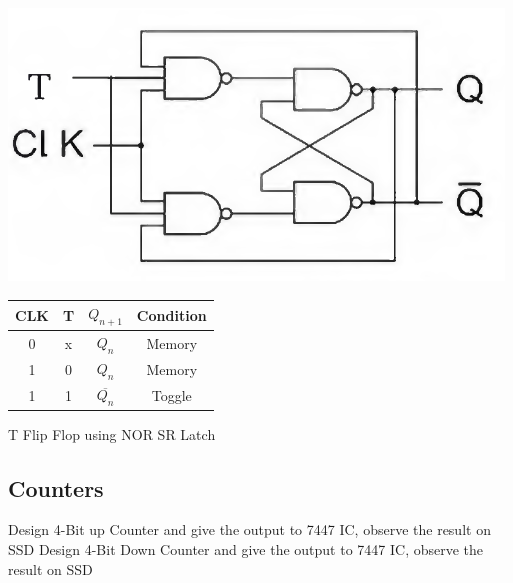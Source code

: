\documentclass[journal,12pt,twocolumn]{IEEEtran}
\begin{document}
\vspace{0.5cm}
\includegraphics[scale=0.48]{img/T-flip-flop}
\begin{table}[h!]
\centering
\begin{tabular}{|c|c|c|c|}
\hline
CLK	&	T	&	$Q_{n+1}$ & Condition \\ \hline
0	&	x	&	$Q_{n}$	& Memory \\ \hline
1	&	0	&	$Q_{n}$	& Memory \\\hline
1	&	1	&	$\overline{Q_n}$ & Toggle	\\\hline
\end{tabular}
\end{table}

\problem T Flip Flop using NOR SR Latch
\subsection{Counters}
\problem Design 4-Bit up Counter and give the output to 7447 IC, observe the result on SSD
\problem Design 4-Bit  Down Counter and give the output to 7447 IC, observe the result on SSD

\end{document}
